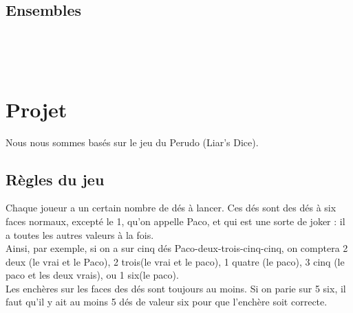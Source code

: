 \documentclass[a4paper, 11pt]{article}
\newenvironment{DDbox}[1]{
\begin{lrbox}{\BBbox}\begin{minipage}{\linewidth}}
{\end{minipage}\end{lrbox}\noindent\colorbox{Zgris}{\usebox{\BBbox}} \\
[.5cm]}
\begin{document}
%     

\subsection{Ensembles}
\begin{DDbox}{\linewidth}
    
\end{DDbox}
\begin{DDbox}{\linewidth}
    
\end{DDbox}

\section{Projet}
Nous nous sommes basés sur le jeu du Perudo (Liar's Dice).

\subsection{Règles du jeu}
Chaque joueur a un certain nombre de dés à lancer.  Ces dés sont des dés à six
faces normaux, excepté le 1, qu'on appelle Paco, et qui est une sorte de joker :
il a toutes les autres valeurs à la fois.
\\
Ainsi, par exemple, si on a sur
cinq dés Paco-deux-trois-cinq-cinq, on comptera 2 deux (le vrai et le Paco), 2
trois(le vrai et le paco), 1 quatre (le paco), 3 cinq (le paco et les deux
vrais), ou 1 six(le paco).
\\
Les enchères sur les faces des dés sont toujours au moins. Si on parie sur 5
six, il faut qu'il y ait au moins 5 dés de valeur six pour que l'enchère soit
correcte.
\end{document}
